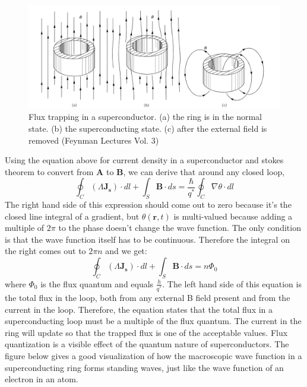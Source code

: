 \documentclass[conf]{new-aiaa}
\begin{document}
\begin{figure}
    \centering
    \includegraphics[scale = 0.6]{fluxQuant.PNG}
    \caption{Flux trapping in a superconductor. (a) the ring is in the normal state. (b) the superconducting state. (c) after the external field is removed (Feynman Lectures Vol. 3)}
    \label{fig:my_label}
\end{figure}

Using the equation above for current density in a superconductor and stokes theorem to convert from $\mathbf{A}$ to $\mathbf{B}$, we can derive that around any closed loop,
$$\oint_C (\Lambda \mathbf{J_s}) \cdot dl + \int_S \mathbf{B} \cdot ds = \frac{\hbar}{q^*} \oint_C \nabla \theta \cdot dl$$
The right hand side of this expression should come out to zero because it's the closed line integral of a gradient, but $\theta(\mathbf{r},t)$ is multi-valued because adding a multiple of $2 \pi$ to the phase doesn't change the wave function. The only condition is that the wave function itself has to be continuous. Therefore the integral on the right comes out to $2 \pi n$ and we get: 
$$\oint_C (\Lambda \mathbf{J_s}) \cdot dl + \int_S \mathbf{B} \cdot ds = n\Phi_0 $$
where $\Phi_0$ is the flux quantum and equals $\frac{h}{q^*}$. The left hand side of this equation is the total flux in the loop, both from any external B field present and from the current in the loop. Therefore, the equation states that the total flux in a superconducting loop must be a multiple of the flux quantum. The current in the ring will update so that the trapped flux is one of the acceptable values. 
Flux quantization is a visible effect of the quantum nature of superconductors. The figure below gives a good visualization of how the macroscopic wave function in a superconducting ring forms standing waves, just like the wave function of an electron in an atom.
\end{document}
